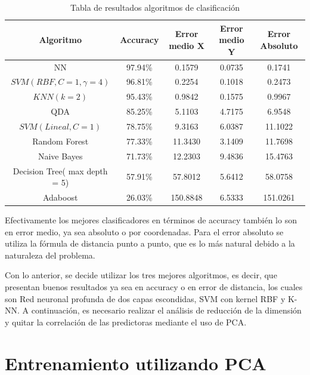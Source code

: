 \begin{table}[ht!]
\centering
\caption[Tabla de resultados algoritmos de clasificación]{Tabla de resultados algoritmos de clasificación}
\label{tabla-clasificacion}
\begin{tabular}{|c|c|c|c|c|}
\hline
Algoritmo                     & Accuracy & Error medio X & Error medio Y & Error Absoluto \\ \hline
NN                            & 97.94\%  & 0.1579        & 0.0735        & 0.1741         \\ \hline
$SVM(RBF, C=1, \gamma = 4)$   & 96.81\%  & 0.2254        & 0.1018        & 0.2473         \\ \hline
$KNN(k = 2)$                  & 95.43\%  & 0.9842        & 0.1575        & 0.9967         \\ \hline
QDA                           & 85.25\%  & 5.1103        & 4.7175        & 6.9548         \\ \hline
$SVM(Lineal, C=1)$            & 78.75\%  & 9.3163        & 6.0387        & 11.1022        \\ \hline
Random Forest                 & 77.33\%  & 11.3430       & 3.1409        & 11.7698        \\ \hline
Naive Bayes                   & 71.73\%  & 12.2303       & 9.4836        & 15.4763        \\ \hline
Decision Tree( max depth = 5) & 57.91\%  & 57.8012       & 5.6412        & 58.0758        \\ \hline
Adaboost                      & 26.03\%  & 150.8848      & 6.5333        & 151.0261       \\ \hline
\end{tabular}
\end{table}


Efectivamente los mejores clasificadores en términos de accuracy también lo son en error medio, ya sea absoluto o por coordenadas. Para el error absoluto se utiliza la fórmula de distancia punto a punto, que es lo más natural debido a la naturaleza del problema.

Con lo anterior, se decide utilizar los tres mejores algoritmos, es decir, que presentan buenos resultados ya sea en accuracy o en error de distancia, los cuales son Red neuronal profunda de dos capas escondidas, SVM con kernel RBF y K-NN. A continuación, es necesario realizar el análisis de reducción de la dimensión y quitar la correlación de las predictoras mediante el uso de PCA.


\section{Entrenamiento utilizando PCA}

